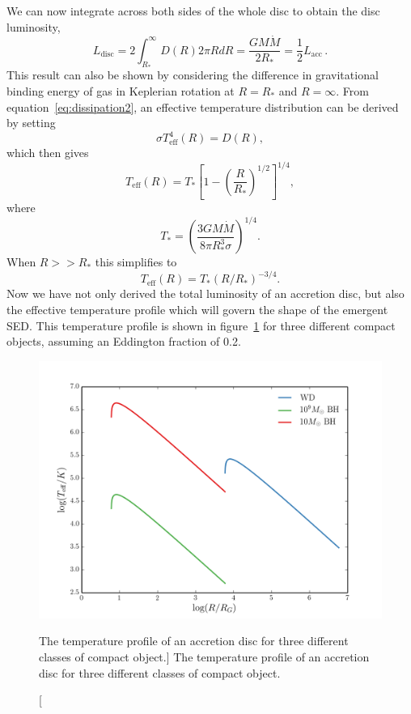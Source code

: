We can now integrate across both sides of the whole disc to obtain the disc luminosity,
\begin{equation}
L_{\mathrm{disc}} = 2 \int^\infty_{R_*} D(R) 2\pi R dR = \frac{G M \dot{M}}{2 R_*} = \frac{1}{2} L_{\mathrm{acc}}\, .
\label{eq:ldisc}
\end{equation}
This result can also be shown by considering the difference in gravitational
binding energy of gas in Keplerian rotation at $R=R_*$ and $R=\infty$.
From equation~\ref{eq:dissipation2}, an 
effective temperature distribution can be derived by setting
\begin{equation}
\sigma T_{\mathrm{eff}}^4 (R) = D(R),
\end{equation}
which then gives
\begin{equation}
T_{\mathrm{eff}} (R) = T_* \left[1 - \left( \frac{R}{R_*} \right)^{1/2} \right]^{1/4},
\label{disk_t_profile}
\end{equation}
where
\begin{equation}
T_* = \left ( \frac{3 G M \dot{M}}{8 \pi R_*^3 \sigma} \right)^{1/4}.
\end{equation}
When $R>>R_*$ this simplifies to
\begin{equation}
T_{\mathrm{eff}} (R) = T_* (R / R_*)^{-3/4}.
\end{equation}
Now we have not only derived the total luminosity of an accretion disc, but
also the effective temperature profile which will govern the shape of the emergent SED.
This temperature profile is shown in figure~\ref{fig:disk_t}
for three different compact objects, assuming an Eddington fraction of 0.2.

\begin{figure}
\centering
\includegraphics[width=1.0\textwidth]{figures/01-intro/disk_t.png}
\caption
[The temperature profile of an accretion disc for three different classes
of compact object.]
{
The temperature profile of an accretion disc for three different classes
of compact object.
} 
\label{fig:disk_t}
\end{figure}

